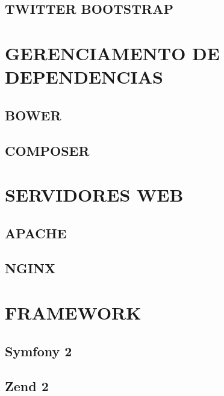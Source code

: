 \documentclass[12pt,floatnumber=continuous,espaco=umemeio]{abnt}
\begin{document}
	\section{TWITTER BOOTSTRAP}
	
	\chapter{GERENCIAMENTO DE DEPENDENCIAS}
	\section{BOWER}
	\section{COMPOSER}
	
	\chapter{SERVIDORES WEB}
	\section{APACHE}
	\section{NGINX}
	
	\chapter{FRAMEWORK}
	\section{Symfony 2}
	\section{Zend 2}
	
	
	
	 
	
\end{document}
